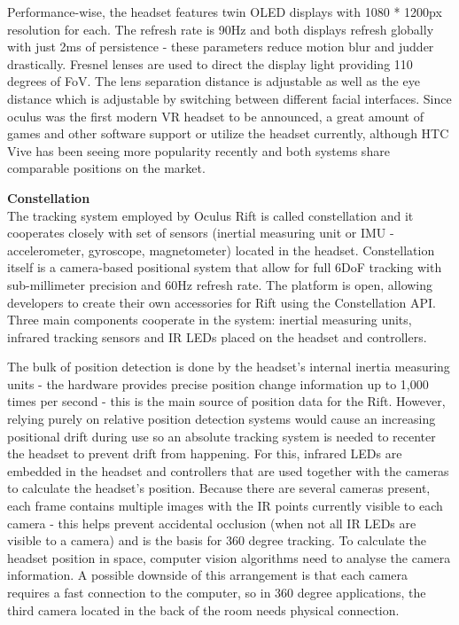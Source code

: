 \documentclass[12pt, a4paper]{article}
\begin{document}
Performance-wise, the headset features twin OLED displays with 1080 * 1200px resolution for each. The refresh rate is 90Hz and both displays refresh globally with just 2ms of persistence - these parameters reduce motion blur and judder drastically. Fresnel lenses are used to direct the display light providing 110 degrees of FoV. The lens separation distance is adjustable as well as the eye distance which is adjustable by switching between different facial interfaces. Since oculus was the first modern VR headset to be announced, a great amount of games and other software support or utilize the headset currently, although HTC Vive has been seeing more popularity recently and both systems share comparable positions on the market.

\textbf{Constellation} \\
The tracking system employed by Oculus Rift is called constellation and it cooperates closely with set of sensors (inertial measuring unit or IMU - accelerometer, gyroscope, magnetometer) located in the headset. Constellation itself is a camera-based positional system that allow for full 6DoF tracking with sub-millimeter precision and 60Hz refresh rate. The platform is open, allowing developers to create their own accessories for Rift using the Constellation API. Three main components cooperate in the system: inertial measuring units, infrared tracking sensors and IR LEDs placed on the headset and controllers.

The bulk of position detection is done by the headset’s internal inertia measuring units - the hardware provides precise position change information up to 1,000 times per second - this is the main source of position data for the Rift. However, relying purely on relative position detection systems would cause an increasing positional drift during use so an absolute tracking system is needed to recenter the headset to prevent drift from happening. For this, infrared LEDs are embedded in the headset and controllers that are used together with the cameras to calculate the headset’s position. Because there are several cameras present, each frame contains multiple images with the IR points currently visible to each camera - this helps prevent accidental occlusion (when not all IR LEDs are visible to a camera) and is the basis for 360 degree tracking. To calculate the headset position in space, computer vision algorithms need to analyse the camera information. A possible downside of this arrangement is that each camera requires a fast connection to the computer, so in 360 degree applications, the third camera located in the back of the room needs physical connection.
\end{document}
